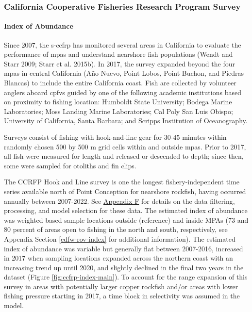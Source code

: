 \documentclass[11pt,
  english,
  letterpaper,
]{article}
\begin{document}
\hypertarget{california-cooperative-fisheries-research-program-survey}{%
\subsubsection{California Cooperative Fisheries Research Program Survey}\label{california-cooperative-fisheries-research-program-survey}}

\hypertarget{index-of-abundance}{%
\paragraph{Index of Abundance}\label{index-of-abundance}}

\hfill\break

Since 2007, the \gls{s-ccfrp} has monitored several areas in California to evaluate the performance of \glspl{mpa} and understand nearshore fish populations (Wendt and Starr 2009; Starr et al. 2015b). In 2017, the survey expanded beyond the four \Gls{mpa}s in central California (Año Nuevo, Point Lobos, Point Buchon, and Piedras Blancas) to include the entire California coast. Fish are collected by volunteer anglers aboard \glspl{cpfv} guided by one of the following academic institutions based on proximity to fishing location: Humboldt State University; Bodega Marine Laboratories; Moss Landing Marine Laboratories; Cal Poly San Luis Obispo; University of California, Santa Barbara; and Scripps Institution of Oceanography.

Surveys consist of fishing with hook-and-line gear for 30-45 minutes within randomly chosen 500 by 500 m grid cells within and outside \glspl{mpa}. Prior to 2017, all fish were measured for length and released or descended to depth; since then, some were sampled for otoliths and fin clips.

The CCRFP Hook and Line survey is one the longest fishery-independent time series available north of Point Conception for nearshore rockfish, having occurred annually between 2007-2022. See \protect\hyperlink{ccfrp-index}{Appendix F} for details on the data filtering, processing, and model selection for these data. The estimated index of abundance was weighted based sample locations outside (reference) and inside MPAs (73 and 80 percent of areas open to fishing in the north and south, respectively, see Appendix Section \ref{cdfw-rov-index} for additional information). The estimated index of abundance was variable but generally flat between 2007-2016, increased in 2017 when sampling locations expanded across the northern coast with an increasing trend up until 2020, and slightly declined in the final two years in the dataset (Figure \ref{fig:ccfrp-index-main}). To account for the range expansion of this survey in areas with potentially larger copper rockfish and/or areas with lower fishing pressure starting in 2017, a time block in selectivity was assumed in the model.
\end{document}
